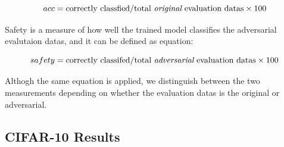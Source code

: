 \documentclass[journal,article,submit,moreauthors,pdftex]{Definitions/mdpi}
\begin{document}
\begin{equation}
    acc = \text{correctly classfied} / \text{total {\it original} evaluation datas} \times 100
\end{equation} 

Safety is a measure of how well the trained model classifies the adversarial evalutaion datas, and it can be defined as equation:

\begin{equation}
    safety = \text{correctly classifed} / \text{total {\it adversarial} evaluation datas} \times 100
\end{equation}

Althogh the same equation is applied, we distinguish between the two measurements depending on whether the evaluation datas is the original or adversarial.

\subsection{CIFAR-10 Results}
\end{document}
